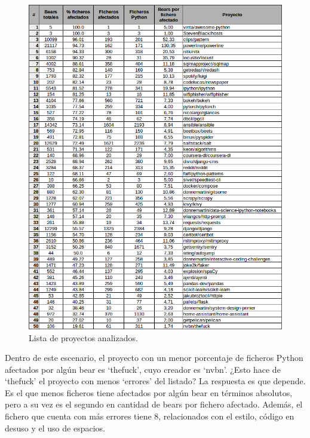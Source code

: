 \documentclass[a4paper, 12pt]{book}
\begin{document}
\begin{figure}[H]
  \centering
  \includegraphics[width=15cm, keepaspectratio]{img/anexoTabla}
  \caption{Lista de proyectos analizados.}
  \label{fig:anexoTabla}
\end{figure}

Dentro de este escenario, el proyecto con un menor porcentaje de ficheros Python afectados por algún bear es `thefuck', cuyo creador es `nvbn'. ¿Esto hace de `thefuck' el proyecto con menos `errores' del listado? La respuesta es que depende. Es el que menos ficheros tiene afectados por algún bear en términos absolutos, pero a su vez es el segundo en cantidad de bears por fichero afectado. Además, el fichero que cuenta con más errores tiene 8, relacionados con el estilo, código en desuso y el uso de espacios.
\end{document}
